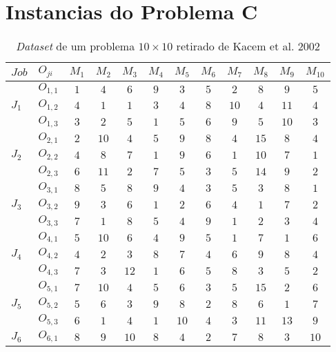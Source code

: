 \section{Instancias do Problema C}
\label{apd:problem-instance-c}
\begin{table}[htb]
    \centering
    \caption{\textit{Dataset} de um problema $10\times10$ retirado de Kacem et al. 2002}
    \begin{tabular}[t]{llcccccccccc}
    \hline
    $Job$&$O_{ji}$&$M_1$&$M_2$&$M_3$&$M_4$&$M_5$&$M_6$&$M_7$&$M_8$&$M_9$&$M_{10}$\\
    \hline
    \multirow{3}{*}{$J_1$}&$O_{1,1}$ & $1$ & $4$ & $6$ & $9$ & $3$ & $5$ & $2$ & $8$ & $9$ & $5$\\
    &$O_{1,2}$ & $4$ & $1$ & $1$ & $3$ & $4$ & $8$ & $10$ & $4$ & $11$ & $4$\\
    &$O_{1,3}$ & $3$ & $2$ & $5$ & $1$ & $5$ & $6$ & $9$ & $5$ & $10$ & $3$\\
    \multirow{3}{*}{$J_2$}&$O_{2,1}$ & $2$ & $10$ & $4$ & $5$ & $9$ & $8$ & $4$ & $15$ & $8$ & $4$\\
    &$O_{2,2}$ & $4$ & $8$ & $7$ & $1$ & $9$ & $6$ & $1$ & $10$ & $7$ & $1$\\
    &$O_{2,3}$ & $6$ & $11$ & $2$ & $7$ & $5$ & $3$ & $5$ & $14$ & $9$ & $2$\\
    \multirow{3}{*}{$J_3$}&$O_{3,1}$ & $8$ & $5$ & $8$ & $9$ & $4$ & $3$ & $5$ & $3$ & $8$ & $1$\\
    &$O_{3,2}$ & $9$ & $3$ & $6$ & $1$ & $2$ & $6$ & $4$ & $1$ & $7$ & $2$\\
    &$O_{3,3}$ & $7$ & $1$ & $8$ & $5$ & $4$ & $9$ & $1$ & $2$ & $3$ & $4$\\
    \multirow{3}{*}{$J_4$}&$O_{4,1}$ & $5$ & $10$ & $6$ & $4$ & $9$ & $5$ & $1$ & $7$ & $1$ & $6$\\
    &$O_{4,2}$ & $4$ & $2$ & $3$ & $8$ & $7$ & $4$ & $6$ & $9$ & $8$ & $4$\\
    &$O_{4,3}$ & $7$ & $3$ & $12$ & $1$ & $6$ & $5$ & $8$ & $3$ & $5$ & $2$\\
    \multirow{3}{*}{$J_5$}&$O_{5,1}$ & $7$ & $10$ & $4$ & $5$ & $6$ & $3$ & $5$ & $15$ & $2$ & $6$\\
    &$O_{5,2}$ & $5$ & $6$ & $3$ & $9$ & $8$ & $2$ & $8$ & $6$ & $1$ & $7$\\
    &$O_{5,3}$ & $6$ & $1$ & $4$ & $1$ & $10$ & $4$ & $3$ & $11$ & $13$ & $9$\\
    \multirow{3}{*}{$J_6$}&$O_{6,1}$ & $8$ & $9$ & $10$ & $8$ & $4$ & $2$ & $7$ & $8$ & $3$ & $10$\\

\end{tabular}
\end{table}
